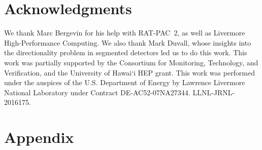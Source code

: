 \documentclass[tightenlines,
twocolumn,prl,notitlepage,nofootinbib,preprintnumbers,longbibliography]{revtex4-1}
\begin{document}


\section{Acknowledgments}
We thank Marc Bergevin for his help with RAT-PAC~2, as well as Livermore High-Performance Computing. We also thank Mark Duvall, whose insights into the directionality problem in segmented detectors led us to do this work.
This work was partially supported by the Consortium for Monitoring, Technology, and Verification, and the University of Hawai`i HEP grant.
This work was performed under the auspices of the U.S. Department of Energy by Lawrence Livermore National Laboratory under Contract DE-AC52-07NA27344. LLNL-JRNL-2016175.



\newpage
\appendix*
\section{Appendix}
\end{document}
